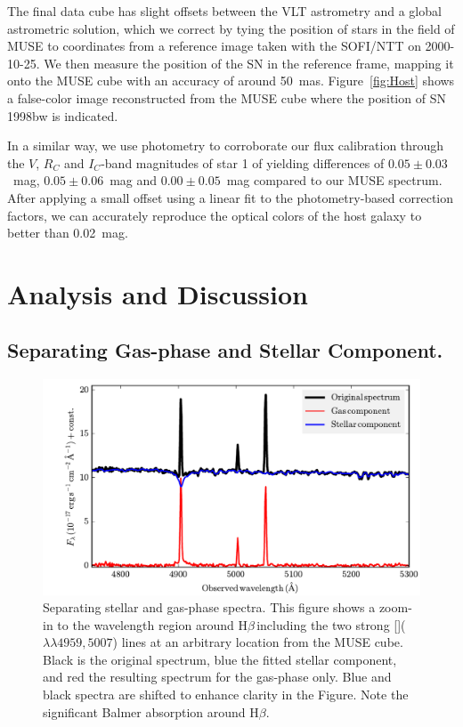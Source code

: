 \documentclass[traditabstract]{aa}
\newcommand{\hb}{H$\beta$}
\newcommand{\oiii}{[\ion{O}{iii}]}
\begin{document}
The final data cube has slight offsets between the VLT astrometry and a global astrometric solution, which we correct by tying the position of stars in the field of MUSE to coordinates from a reference image taken with the SOFI/NTT on 2000-10-25. We then measure the position of the SN in the reference frame, mapping it onto the MUSE cube with an accuracy of around 50~mas. Figure~\ref{fig:Host} shows a false-color image reconstructed from the MUSE cube where the position of SN\,1998bw is indicated.

In a similar way, we use photometry to corroborate our flux calibration through the $V$, $R_C$ and $I_C$-band magnitudes of star 1 of \citet{2011AJ....141..163C} yielding differences of $0.05\pm0.03$~mag, $0.05\pm0.06$~mag and $0.00\pm0.05$~mag compared to our MUSE spectrum. After applying a small offset using a linear fit to the photometry-based correction factors, we can accurately reproduce the optical colors of the host galaxy \citep{2005NewA...11..103S} to better than 0.02~mag.


\section{Analysis and Discussion}

\subsection{Separating Gas-phase and Stellar Component.}

\begin{figure}
\includegraphics[angle=0, width=0.99\columnwidth]{Figs/Stargas_spec.pdf}
\caption{Separating stellar and gas-phase spectra. This figure shows a zoom-in to the wavelength region around \hb\,including the two strong \oiii($\lambda\lambda4959,5007$) lines at an arbitrary location from the MUSE cube. Black is the original spectrum, blue the fitted stellar component, and red the resulting spectrum for the gas-phase only. Blue and black spectra are shifted to enhance clarity in the Figure. Note the significant Balmer absorption around \hb.}
\label{fig:stargas}
\end{figure}
\end{document}
